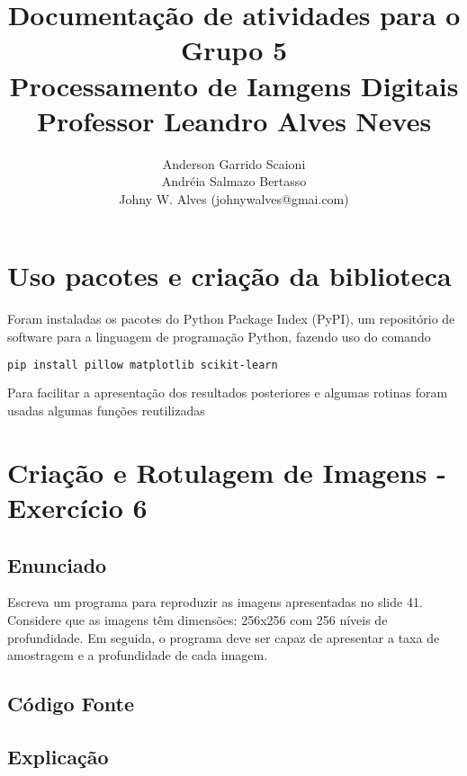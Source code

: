 \documentclass[10pt,a4paper]{article}
\title{Documentação de atividades para o Grupo 5 \\ Processamento de Iamgens Digitais \\ Professor Leandro Alves Neves}
\author{Anderson Garrido Scaioni \\ Andréia Salmazo Bertasso \\ Johny W. Alves (johnywalves@gmai.com)}
\begin{document}
\maketitle

\section{Uso pacotes e criação da biblioteca}

\begin{flushleft}
Foram instaladas os pacotes do Python Package Index (PyPI), um repositório de software para a linguagem de programação Python, fazendo uso do comando
\end{flushleft}

\begin{lstlisting}[language=Bash]
pip install pillow matplotlib scikit-learn
\end{lstlisting}

\begin{flushleft}
Para facilitar a apresentação dos resultados posteriores e algumas rotinas foram usadas algumas funções reutilizadas
\end{flushleft}



\section{Criação e Rotulagem de Imagens - Exercício 6}

\subsection{Enunciado}

Escreva um programa para reproduzir as imagens apresentadas no slide 41. Considere que as imagens têm dimensões: 256x256 com 256 níveis de profundidade. Em seguida, o programa deve ser capaz de apresentar a taxa de amostragem e a profundidade de cada imagem.

\subsection{Código Fonte}



\subsection{Explicação}
\end{document}
